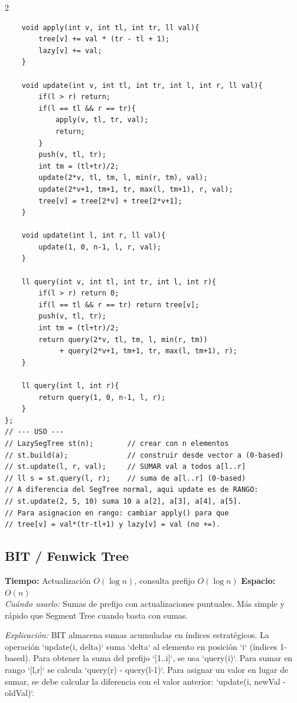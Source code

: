 \documentclass[10pt,a4paper]{article}
\begin{document}
\begin{multicols}{2}
\begin{lstlisting}
    void apply(int v, int tl, int tr, ll val){
        tree[v] += val * (tr - tl + 1);
        lazy[v] += val;
    }

    void update(int v, int tl, int tr, int l, int r, ll val){
        if(l > r) return;
        if(l == tl && r == tr){
            apply(v, tl, tr, val);
            return;
        }
        push(v, tl, tr);
        int tm = (tl+tr)/2;
        update(2*v, tl, tm, l, min(r, tm), val);
        update(2*v+1, tm+1, tr, max(l, tm+1), r, val);
        tree[v] = tree[2*v] + tree[2*v+1];
    }

    void update(int l, int r, ll val){
        update(1, 0, n-1, l, r, val);
    }

    ll query(int v, int tl, int tr, int l, int r){
        if(l > r) return 0;
        if(l == tl && r == tr) return tree[v];
        push(v, tl, tr);
        int tm = (tl+tr)/2;
        return query(2*v, tl, tm, l, min(r, tm))
             + query(2*v+1, tm+1, tr, max(l, tm+1), r);
    }

    ll query(int l, int r){
        return query(1, 0, n-1, l, r);
    }
};
// --- USO ---
// LazySegTree st(n);        // crear con n elementos
// st.build(a);              // construir desde vector a (0-based)
// st.update(l, r, val);     // SUMAR val a todos a[l..r]
// ll s = st.query(l, r);    // suma de a[l..r] (0-based)
// A diferencia del SegTree normal, aqui update es de RANGO:
// st.update(2, 5, 10) suma 10 a a[2], a[3], a[4], a[5].
// Para asignacion en rango: cambiar apply() para que
// tree[v] = val*(tr-tl+1) y lazy[v] = val (no +=).
\end{lstlisting}

\subsection{BIT / Fenwick Tree}
\textbf{Tiempo:} Actualizaci\'on $O(\log n)$, consulta prefijo $O(\log n)$ \quad \textbf{Espacio:} $O(n)$\\
\textit{Cu\'ando usarlo:} Sumas de prefijo con actualizaciones puntuales. M\'as simple y r\'apido que Segment Tree cuando basta con sumas.

\textit{Explicación:} BIT almacena sumas acumuladas en índices estratégicos. La operación `update(i, delta)` suma `delta` al elemento en posición `i` (índices 1-based). Para obtener la suma del prefijo `[1..i]`, se usa `query(i)`. Para sumar en rango `[l,r]` se calcula `query(r) - query(l-1)`. Para asignar un valor en lugar de sumar, se debe calcular la diferencia con el valor anterior: `update(i, newVal - oldVal)`.


\end{multicols}
\end{document}

